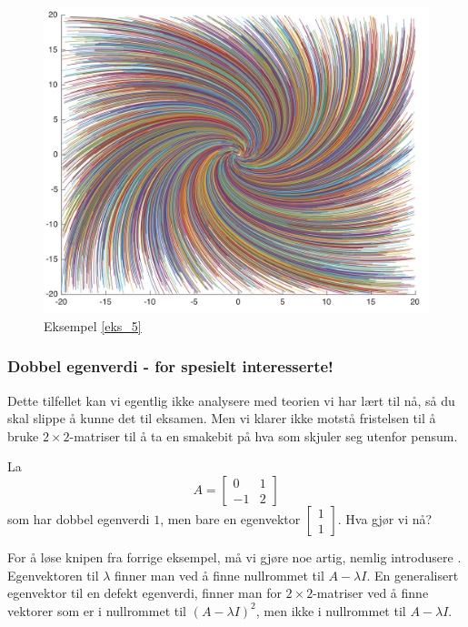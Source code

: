 \begin{figure}[htbp]
  \begin{center}
	\includegraphics[scale=.1]{eks_5.jpg}
	\captionsetup{labelformat=empty}
	\caption{Eksempel \ref{eks_5}}
	\end{center}
\end{figure}
\subsubsection*{Dobbel egenverdi - for spesielt interesserte!}
Dette tilfellet kan vi egentlig ikke analysere med teorien vi har lært til nå, så du skal slippe å kunne det til eksamen. 
Men vi klarer ikke motstå fristelsen til å  bruke $2 \times 2$-matriser til å ta en smakebit på hva som skjuler seg utenfor pensum. 

\begin{ex}
La 
\[
A=
\begin{bmatrix}
0 & 1   \\
-1 & 2
\end{bmatrix}
\]
som har dobbel egenverdi $1$, men bare en egenvektor
$
\begin{bmatrix}
1  \\
1 
\end{bmatrix}
$.
Hva gjør vi nå?
\end{ex}

For å løse knipen fra forrige eksempel, må vi gjøre noe artig, nemlig introdusere . 
Egenvektoren til $\lambda$ finner man ved å finne nullrommet til $A-\lambda I$. 
En generalisert egenvektor til en defekt egenverdi, finner man for $2 \times 2$-matriser ved å finne vektorer som er i nullrommet til $(A-\lambda I)^2$, 
men ikke i nullrommet til $A-\lambda I$.

